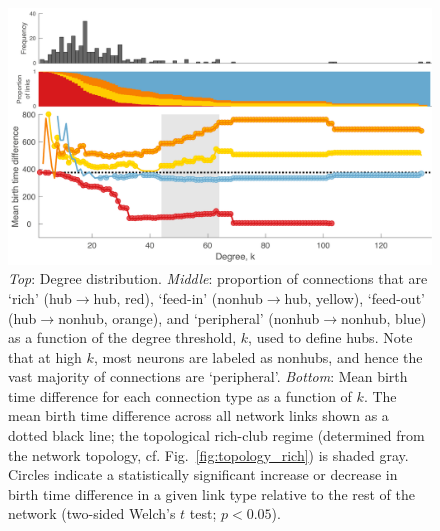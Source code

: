\documentclass[10pt,letterpaper]{article}
\begin{document}
\begin{figure}[!h]
\label{BirthTimesk}
\centering
    \includegraphics[width=1\textwidth]{birthTimeRPFALL.pdf}
    \caption{
\emph{Top}: Degree distribution.
\emph{Middle}: proportion of connections that are `rich' (hub$\rightarrow$hub, red), `feed-in' (nonhub$\rightarrow$hub, yellow), `feed-out' (hub$\rightarrow$nonhub, orange), and `peripheral' (nonhub$\rightarrow$nonhub, blue) as a function of the degree threshold, $k$, used to define hubs.
Note that at high $k$, most neurons are labeled as nonhubs, and hence the vast majority of connections are `peripheral'.
\emph{Bottom}: Mean birth time difference for each connection type as a function of $k$.
The mean birth time difference across all network links shown as a dotted black line; the topological rich-club regime (determined from the network topology, cf. Fig.~\ref{fig:topology_rich}) is shaded gray.
Circles indicate a statistically significant increase or decrease in birth time difference in a given link type relative to the rest of the network (two-sided Welch's $t$ test; $p < 0.05$).
}
\end{figure}

\end{document}
